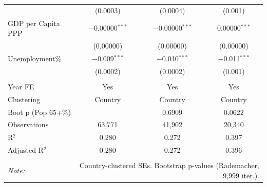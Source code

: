 \begin{table}[!htbp]
\begin{tabular}{@{\extracolsep{5pt}}lccc}
  & (0.0003) & (0.0004) & (0.001) \\ 
  GDP per Capita PPP & $-$0.00000$^{***}$ & $-$0.00000$^{***}$ & 0.00000$^{***}$ \\ 
  & (0.00000) & (0.00000) & (0.00000) \\ 
  Unemployment\% & $-$0.009$^{***}$ & $-$0.010$^{***}$ & $-$0.011$^{***}$ \\ 
  & (0.0002) & (0.0002) & (0.001) \\ 
 \hline \\[-1.8ex] 
Year FE & Yes & Yes & Yes \\ 
Clustering & Country & Country & Country \\ 
Boot p (Pop 65+\%) &  & 0.6909 & 0.0622 \\ 
Observations & 63,771 & 41,902 & 20,340 \\ 
R$^{2}$ & 0.280 & 0.272 & 0.397 \\ 
Adjusted R$^{2}$ & 0.280 & 0.272 & 0.396 \\ 
\hline 
\hline \\[-1.8ex] 
\textit{Note:}  & \multicolumn{3}{r}{Country-clustered SEs. Bootstrap p-values (Rademacher, 9,999 iter.).} \\ 
\end{tabular} 
\end{table} 
